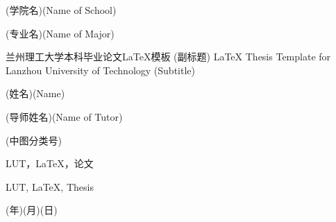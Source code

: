 
\school
{(学院名)}{(Name of School)}

\major
{(专业名)}{(Name of Major)}



\thesistitle
{兰州理工大学本科毕业论文\LaTeX{}模板}
{(副标题)}
{\LaTeX{} Thesis Template for Lanzhou University of Technology}
{(Subtitle)}

\thesisauthor
{(姓名)}{(Name)}

\teacher
{(导师姓名)}{(Name of Tutor)}


\category
{(中图分类号)}

\keywordzh
{LUT，\LaTeX{}，论文}

\keyworden
{LUT, \LaTeX{}, Thesis}

{(年)}{(月)}{(日)}